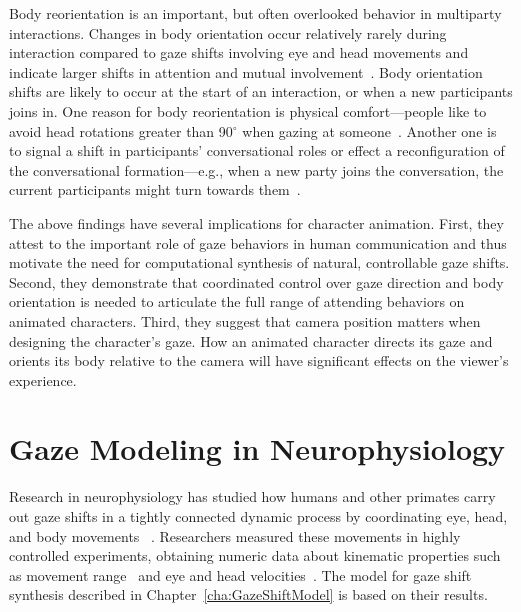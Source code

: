 Body reorientation is an important, but often overlooked behavior in multiparty interactions. Changes in body orientation occur relatively rarely during interaction compared to gaze shifts involving eye and head movements and indicate larger shifts in attention and mutual involvement~\cite{kendon1973visible,schegloff1998bodytorque}. Body orientation shifts are likely to occur at the start of an interaction, or when a new participants joins in. One reason for body reorientation is physical comfort---people like to avoid head rotations greater than 90$^{\circ}$ when gazing at someone~\cite{kendon1973visible}. Another one is to signal a shift in participants' conversational roles or effect a reconfiguration of the conversational formation---e.g., when a new party joins the conversation, the current participants might turn towards them~\cite{kendon2010spacing}.

The above findings have several implications for character animation. First, they attest to the important role of gaze behaviors in human communication and thus motivate the need for computational synthesis of natural, controllable gaze shifts. Second, they demonstrate that coordinated control over gaze direction and body orientation is needed to articulate the full range of attending behaviors on animated characters. Third, they suggest that camera position matters when designing the character's gaze. How an animated character directs its gaze and orients its body relative to the camera will have significant effects on the viewer's experience.

\section{Gaze Modeling in Neurophysiology}

Research in neurophysiology has studied how humans and other primates carry out gaze shifts in a tightly connected dynamic process by coordinating eye, head, and body movements  ~\cite{zangemeister1982types,andredeshays1988eyehead1,barnes1979vor,freedman2000coordination,uemura1980eyehead,mccluskey2007monkeys}. Researchers measured these movements in highly controlled experiments, obtaining numeric data about kinematic properties such as movement range~\cite{guitton1987gaze} and eye and head velocities~\cite{guitton1987gaze,freedman2000coordination,barnes1979vor,uemura1980eyehead}. The model for gaze shift synthesis described in Chapter~\ref{cha:GazeShiftModel} is based on their results.

